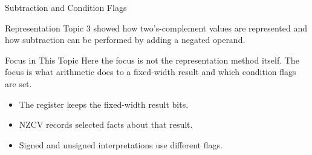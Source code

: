 \documentclass[aspectratio=169,11pt,t]{beamer}
\begin{document}

\begin{frame}{Subtraction and Condition Flags}

\begin{block}{Representation}
Topic 3 showed how two's-complement values are represented and how subtraction can be performed by adding a negated operand.
\end{block}

\vspace{0.25cm}

\begin{block}{Focus in This Topic}
Here the focus is not the representation method itself. The focus is what arithmetic does to a fixed-width result and which condition flags are set.
\end{block}

\vspace{0.25cm}

\begin{itemize}\setlength{\itemsep}{6pt}
  \item The register keeps the fixed-width result bits.
  \item NZCV records selected facts about that result.
  \item Signed and unsigned interpretations use different flags.
\end{itemize}

\end{frame}














\end{document}

